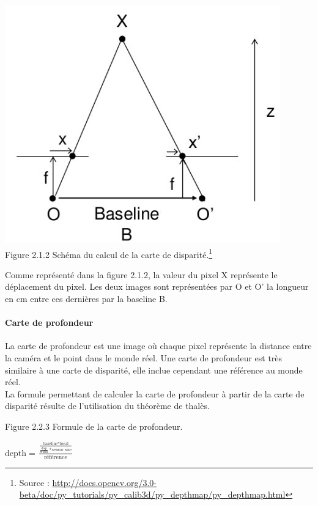 \documentclass[12pt,a4paper]{report}
\begin{document}
\begin{center}
	\includegraphics[scale=0.5]{disparity.jpg}\\
	Figure 2.1.2 Schéma du calcul de la carte de disparité.\footnote{Source : \url{http://docs.opencv.org/3.0-beta/doc/py_tutorials/py_calib3d/py_depthmap/py_depthmap.html}}\\
\end{center}

Comme représenté dans la figure 2.1.2, la valeur du pixel X représente le déplacement du pixel.
Les deux images sont représentées par O et O' la longueur en cm entre ces dernières par la baseline B.
\paragraph{Carte de profondeur}
La carte de profondeur est une image où chaque pixel représente la distance entre la caméra et le point dans le monde réel. Une carte de profondeur est très similaire à une carte de disparité, elle inclue cependant une référence au monde réel.\\
La formule permettant de calculer la carte de profondeur à partir de la carte de disparité résulte de l'utilisation du théorème de thalès.\\

\begin{center}
Figure 2.2.3 Formule de la carte de profondeur.\\

\begin{huge}
$\text{depth} = \frac{\frac{\text{baseline} * \text{focal}}{\frac{\text{disp}}{\text{width}} * \text{sensor size}}}{\text{référence}}$\\
\end{huge}
\end{center}
\end{document}
